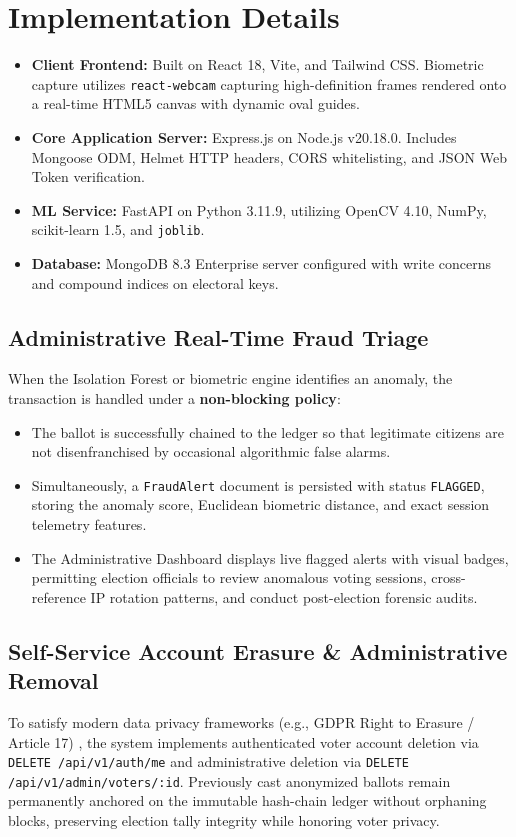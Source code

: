\documentclass[conference]{IEEEtran}
\begin{document}
\section{Implementation Details}
\begin{itemize}
    \item \textbf{Client Frontend:} Built on React 18, Vite, and Tailwind CSS. Biometric capture utilizes \texttt{react-webcam} capturing high-definition frames rendered onto a real-time HTML5 canvas with dynamic oval guides.
    \item \textbf{Core Application Server:} Express.js on Node.js v20.18.0. Includes Mongoose ODM, Helmet HTTP headers, CORS whitelisting, and JSON Web Token verification.
    \item \textbf{ML Service:} FastAPI on Python 3.11.9, utilizing OpenCV 4.10, NumPy, scikit-learn 1.5, and \texttt{joblib}.
    \item \textbf{Database:} MongoDB 8.3 Enterprise server configured with write concerns and compound indices on electoral keys.
\end{itemize}

\subsection{Administrative Real-Time Fraud Triage}
When the Isolation Forest or biometric engine identifies an anomaly, the transaction is handled under a \textbf{non-blocking policy}:
\begin{itemize}
    \item The ballot is successfully chained to the ledger so that legitimate citizens are not disenfranchised by occasional algorithmic false alarms.
    \item Simultaneously, a \texttt{FraudAlert} document is persisted with status \texttt{FLAGGED}, storing the anomaly score, Euclidean biometric distance, and exact session telemetry features.
    \item The Administrative Dashboard displays live flagged alerts with visual badges, permitting election officials to review anomalous voting sessions, cross-reference IP rotation patterns, and conduct post-election forensic audits.
\end{itemize}

\subsection{Self-Service Account Erasure \& Administrative Removal}
To satisfy modern data privacy frameworks (e.g., GDPR Right to Erasure / Article 17) \cite{gdpr2016regulation}, the system implements authenticated voter account deletion via \texttt{DELETE /api/v1/auth/me} and administrative deletion via \texttt{DELETE /api/v1/admin/voters/:id}. Previously cast anonymized ballots remain permanently anchored on the immutable hash-chain ledger without orphaning blocks, preserving election tally integrity while honoring voter privacy.
\end{document}

